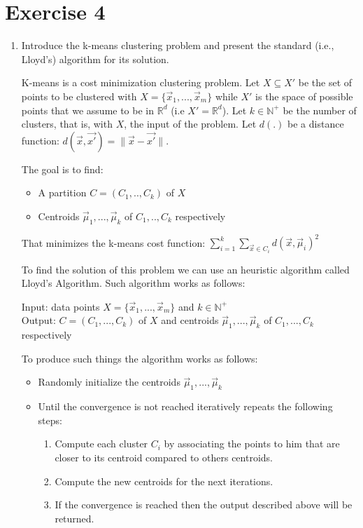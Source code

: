 \documentclass[a4paper,11pt,oneside]{book}
\begin{document}
\section{Exercise 4}
\begin{enumerate}
\item Introduce the k-means clustering problem and present the standard (i.e., Lloyd's) algorithm for its solution.
    \begin{solution}
        K-means is a cost minimization clustering problem. Let $X \subseteq X'$ be the set of points to be clustered with $X = \{\vec{x}_1,...,\vec{x}_m\}$ while $X'$ is the space of possible points that we assume to be in $\mathbb{R}^d$ (i.e $X' = \mathbb{R}^d$).
        Let $k \in \mathbb{N}^+$ be the number of clusters, that is, with $X$, the input of the problem.
        Let $d(.)$ be a distance function: $d(\vec{x},\vec{x'}) = \|\vec{x} - \vec{x'}\|$.
        
        The goal is to find:
        \begin{itemize}
        \item A partition $C = (C_1,..,C_k)$ of $X$
        \item Centroids $\vec{\mu}_1,...,\vec{\mu}_k$ of $C_1,..,C_k$ respectively
        \end{itemize}
        
        That minimizes the k-means cost function: $\sum_{i=1}^k \sum_{\vec{x}\in C_i} d(\vec{x},\vec{\mu}_i)^2$
        
        To find the solution of this problem we can use an heuristic algorithm called Lloyd's Algorithm. Such algorithm works as follows:
        
        Input: data points $X = \{\vec{x}_1,...,\vec{x}_m\}$ and $k \in \mathbb{N}^+$\\
        Output: $C = (C_1,...,C_k)$ of $X$ and centroids $\vec{\mu}_1,...,\vec{\mu}_k$ of $C_1,...,C_k$ respectively
        
        To produce such things the algorithm works as follows:
        \begin{itemize}
        \item Randomly initialize the centroids $\vec{\mu}_1,...,\vec{\mu}_k$
        \item Until the convergence is not reached iteratively repeats the following steps:
        \begin{enumerate}
        \item Compute each cluster $C_i$ by associating the points to him that are closer to its centroid compared to others centroids.
        \item Compute the new centroids for the next iterations.
        \item If the convergence is reached then the output described above will be returned.
        \end{enumerate}
        \end{itemize}
        

\end{solution}
\end{enumerate}
\end{document}
